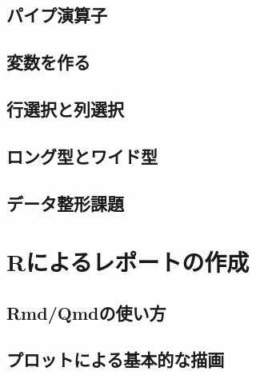 \documentclass[
  a4paper,
]{ltjsbook}
\begin{document}
\hypertarget{ux30d1ux30a4ux30d7ux6f14ux7b97ux5b50}{%
\section{パイプ演算子}\label{ux30d1ux30a4ux30d7ux6f14ux7b97ux5b50}}

\hypertarget{ux5909ux6570ux3092ux4f5cux308b}{%
\section{変数を作る}\label{ux5909ux6570ux3092ux4f5cux308b}}

\hypertarget{ux884cux9078ux629eux3068ux5217ux9078ux629e}{%
\section{行選択と列選択}\label{ux884cux9078ux629eux3068ux5217ux9078ux629e}}

\hypertarget{ux30edux30f3ux30b0ux578bux3068ux30efux30a4ux30c9ux578b}{%
\section{ロング型とワイド型}\label{ux30edux30f3ux30b0ux578bux3068ux30efux30a4ux30c9ux578b}}

\hypertarget{ux30c7ux30fcux30bfux6574ux5f62ux8ab2ux984c}{%
\section{データ整形課題}\label{ux30c7ux30fcux30bfux6574ux5f62ux8ab2ux984c}}


\hypertarget{rux306bux3088ux308bux30ecux30ddux30fcux30c8ux306eux4f5cux6210}{%
\chapter{Rによるレポートの作成}\label{rux306bux3088ux308bux30ecux30ddux30fcux30c8ux306eux4f5cux6210}}

\hypertarget{rmdqmdux306eux4f7fux3044ux65b9}{%
\section{Rmd/Qmdの使い方}\label{rmdqmdux306eux4f7fux3044ux65b9}}

\hypertarget{ux30d7ux30edux30c3ux30c8ux306bux3088ux308bux57faux672cux7684ux306aux63cfux753b}{%
\section{プロットによる基本的な描画}\label{ux30d7ux30edux30c3ux30c8ux306bux3088ux308bux57faux672cux7684ux306aux63cfux753b}}
\end{document}
